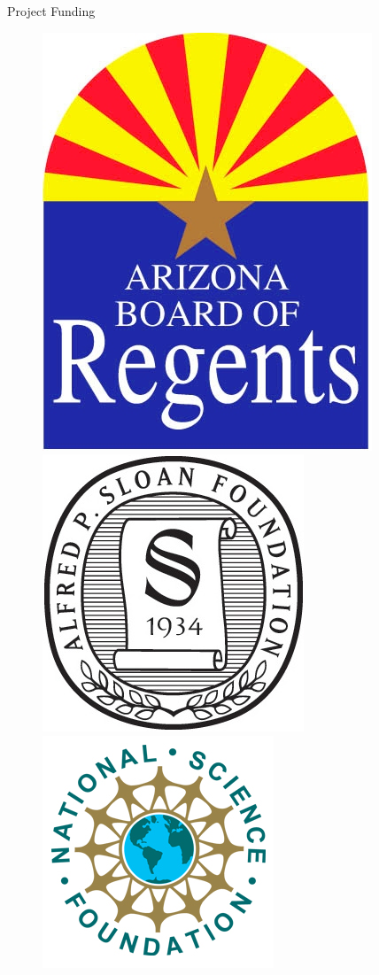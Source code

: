 \documentclass[final]{beamer}
\newlength{\colwidth}
\begin{document}
\begin{frame}[t]
\begin{columns}[t]
\begin{column}{\colwidth}
  \begin{block}{Project Funding}
  \begin{figure}[!htb]
      \includegraphics[width=.53\linewidth]{assets/SponsorLogos/ABOR}
    \endminipage
      \includegraphics[width=.63\linewidth]{assets/SponsorLogos/APSloanFdn}
    \endminipage\hfill
      \includegraphics[width=.75\linewidth]{assets/SponsorLogos/NSF}

\end{figure}
\end{block}
\end{column}
\end{columns}
\end{frame}
\end{document}
